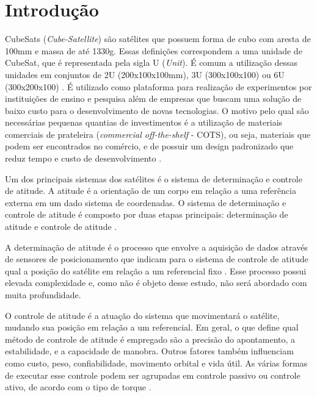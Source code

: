 \documentclass[
	12pt,				%
	openany,			%
	twoside,			%
	a4paper,			%
	english,			%
	french,				%
	spanish,			%
	brazil,				%
	oldfontcommands
	]{abntex2}
\begin{document}
\tableofcontents*
\cleardoublepage

\textual

\chapter{Introdução}

CubeSats (\textit{Cube-Satellite}) são satélites que possuem forma de cubo com aresta de 100mm e massa de até 1330g. Essas definições correspondem a uma unidade de CubeSat, que é representada pela sigla U (\textit{Unit}). É comum a utilização dessas unidades em conjuntos de 2U (200x100x100mm), 3U (300x100x100) ou 6U (300x200x100) \cite{NASA}. É utilizado como plataforma para realização de experimentos por instituições de ensino e pesquisa além de empresas que buscam uma solução de baixo custo para o desenvolvimento de novas tecnologias. O motivo pelo qual são necessárias pequenas quantias de investimentos é a utilização de materiais comerciais de prateleira (\textit{commercial off-the-shelf} - COTS), ou seja, materiais que podem ser encontrados no comércio, e de possuir um design padronizado que reduz tempo e custo de desenvolvimento \cite{CalPoly}.

Um dos principais sistemas dos satélites é o sistema de determinação e controle de atitude. A atitude é a orientação de um corpo em relação a uma referência externa em um dado sistema de coordenadas. O sistema de determinação e controle de atitude é composto por duas etapas principais: determinação de atitude e controle de atitude \cite{FrancLav}.

A determinação de atitude é o processo que envolve a aquisição de dados através de sensores de posicionamento que indicam para o sistema de controle de atitude qual a posição do satélite em relação a um referencial fixo \cite{FrancLav}. Esse processo possui elevada complexidade e, como não é objeto desse estudo, não será abordado com muita profundidade.

O controle de atitude é a atuação do sistema que movimentará o satélite, mudando sua posição em relação a um referencial. Em geral, o que define qual método de controle de atitude é empregado são a precisão do apontamento, a estabilidade, e a capacidade de manobra. Outros fatores também influenciam como custo, peso, confiabilidade, movimento orbital e vida útil. As várias formas de executar esse controle podem ser agrupadas em controle passivo ou controle ativo, de acordo com o tipo de torque \cite{FrancLav}.
\end{document}
